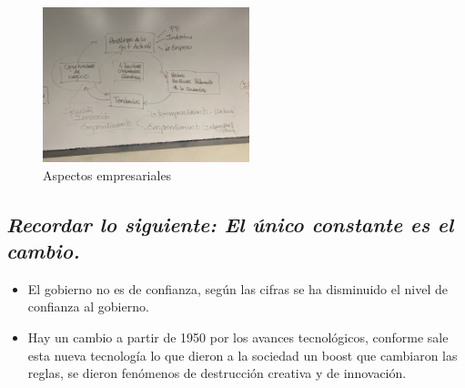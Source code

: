 \begin{figure}[htbp]
    \centering
    \includegraphics[width=6cm]{./../__Imagenes__/2020-01-15-Empresarialidad.jpeg}
    \caption{Aspectos empresariales}
    \label{}
\end{figure} 
\subsection{\emph{\textbf{Recordar lo siguiente: }El único constante es el cambio.}}
\begin{itemize}
    \item El gobierno no es de confianza, según las cifras se ha disminuido el nivel de confianza al gobierno.
    \item Hay un cambio a partir de 1950 por los avances tecnológicos, conforme sale esta nueva tecnología lo que dieron a la sociedad un boost que cambiaron las reglas, se dieron fenómenos de destrucción creativa y de innovación.
\end{itemize}
